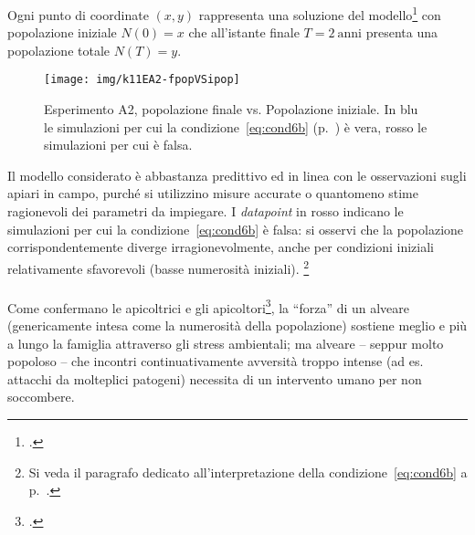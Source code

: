 Ogni punto di coordinate $(x,y)$ rappresenta una soluzione del modello\footcite{khoury2011} con popolazione iniziale
$N(0) = x$ che all'istante finale $T=2~\text{anni}$ presenta una popolazione totale $N(T) = y$.

\begin{figure}[hbt]
    \centering
    \texttt{[image: img/k11EA2-fpopVSipop]}

    \caption[Esperimento A2, popolazione finale vs. Popolazione iniziale.]{Esperimento A2, popolazione finale vs.
    Popolazione iniziale. In blu le simulazioni per cui la condizione~\eqref{eq:cond6b} (p.~\pageref{eq:cond6b}) è vera,
    rosso le simulazioni per cui è falsa.}

    \label{img:kh11expA22}
\end{figure}

Il modello considerato è abbastanza predittivo ed in linea con le osservazioni sugli apiari in campo, purché si
utilizzino misure accurate o quantomeno stime ragionevoli dei parametri da impiegare.
I \emph{datapoint} in rosso indicano le simulazioni per cui la condizione~\eqref{eq:cond6b} è falsa: si
osservi che la popolazione corrispondentemente diverge irragionevolmente, anche per condizioni iniziali
relativamente sfavorevoli (\ie basse numerosità iniziali).
\footnote{Si veda il paragrafo dedicato all'interpretazione della condizione~\eqref{eq:cond6b}
a p.~\pageref{par:interpretationCond6b}.}

\paragraph{}
Come confermano le apicoltrici e gli apicoltori\footcite{privFDL,privFPan,meccanica},
la ``forza'' di un alveare (genericamente intesa come la numerosità della popolazione)
sostiene meglio e più a lungo la famiglia attraverso gli stress ambientali;
ma alveare -- seppur molto popoloso -- che incontri continuativamente avversità troppo intense (ad es. attacchi da
molteplici patogeni) necessita di un intervento umano per non soccombere.

